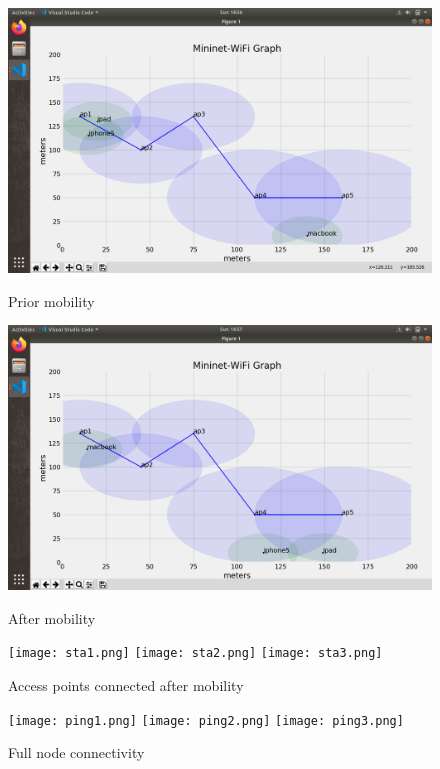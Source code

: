 \documentclass{article}
\begin{document}
    	\begin{figure}[h]
        			\includegraphics[width=0.9\linewidth]{beforeMobility.png}
        			\caption{Prior mobility}
       			\label{fig:t1-3}
        		\endminipage
        			\includegraphics[width=0.9\linewidth]{afterMobility.png}
        			\caption{After mobility}
        			\label{fig:t1-4}
        		\endminipage\vspace{10pt}
        			\texttt{[image: sta1.png]}
        			\texttt{[image: sta2.png]}
        			\texttt{[image: sta3.png]}
        			\caption{Access points connected after mobility}
        			\label{fig:t1-5}
        		\endminipage\vspace{10pt}
        			\texttt{[image: ping1.png]}
        			\texttt{[image: ping2.png]}
       			\texttt{[image: ping3.png]}
        			\caption{Full node connectivity}
        			\label{fig:t1-6}
        		\endminipage
    	\end{figure}

\newpage
\end{document}
